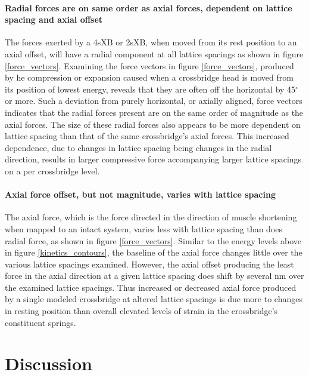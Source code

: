 \documentclass[]{article}
\begin{document}
\paragraph{Radial forces are on same order as axial forces, dependent on lattice spacing and axial offset} %
The forces exerted by a 4sXB or 2sXB, when moved from its rest position to an axial offset, will have a radial component at all lattice spacings as shown in figure \ref{force_vectors}. 
Examining the force vectors in figure \ref{force_vectors}, produced by he compression or expansion caused when a crossbridge head is moved from its position of lowest energy, reveals that they are often off the horizontal by 45$^\circ$ or more. 
Such a deviation from purely horizontal, or axially aligned, force vectors indicates that the radial forces present are on the same order of magnitude as the axial forces. 
The size of these radial forces also appears to be more dependent on lattice spacing than that of the same crossbridge's axial forces. 
This increased dependence, due to changes in lattice spacing being changes in the radial direction, results in larger compressive force accompanying larger lattice spacings on a per crossbridge level. 

\paragraph{Axial force offset, but not magnitude, varies with lattice spacing} %
The axial force, which is the force directed in the direction of muscle shortening when mapped to an intact system, varies less with lattice spacing than does radial force, as shown in figure \ref{force_vectors}. 
Similar to the energy levels above in figure \ref{kinetics_contours}, the baseline of the axial force changes little over the various lattice spacings examined. 
However, the axial offset producing the least force in the axial direction at a given lattice spacing does shift by several nm over the examined lattice spacings. 
Thus increased or decreased axial force produced by a single modeled crossbridge at altered lattice spacings is due more to changes in resting position than overall elevated levels of strain in the crossbridge's constituent springs.



\section{Discussion} %
\end{document}

